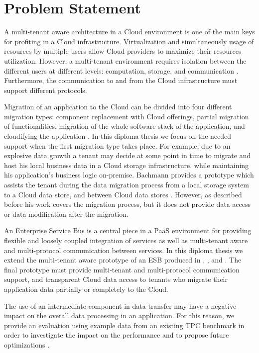 \section{Problem Statement}
\label{sec:problemstatement}     

A multi-tenant aware architecture in a Cloud environment is one of the main keys for profiting in a Cloud infrastructure. Virtualization and simultaneously usage of resources by multiple users allow Cloud providers to maximize their resources utilization. However, a multi-tenant environment requires isolation between the different users at different levels: computation, storage, and communication \cite{EnablingMT}. Furthermore, the communication to and from the Cloud infrastructure must support different protocols. 

Migration of an application to the Cloud can be divided into four different migration types: component replacement with Cloud offerings, partial migration of functionalities, migration of the whole software stack of the application, and cloudifying the application \cite{andrikopoulos2013}. In this diploma thesis we focus on the needed support when the first migration type takes place. For example, due to an explosive data growth a tenant may decide at some point in time to migrate and host his local business data in a Cloud storage infrastructure, while maintaining his application's business logic on-premise. Bachmann provides a prototype which assists the tenant during the data migration process from a local storage system to a Cloud data store, and between Cloud data stores \cite{bachmann2012}. However, as described before his work covers the migration process, but it does not provide data access or data modification after the migration. 

An Enterprise Service Bus is a central piece in a \ac{PaaS} environment for providing flexible and loosely coupled integration of services as well as multi-tenant aware and multi-protocol communication between services. In this diploma thesis we extend the multi-tenant aware prototype of an \ac{ESB} produced in \cite{Muhler2012}, \cite{Essl2011}, and \cite{gomez2012}. The final prototype must provide multi-tenant and multi-protocol communication support, and transparent Cloud data access to tenants who migrate their application data partially or completely to the Cloud. 

The use of an intermediate component in data transfer may have a negative impact on the overall data processing in an application. For this reason, we provide an evaluation using example data from an existing TPC benchmark in order to investigate the impact on the performance and to propose future optimizations \cite{tcpbenchmark}.